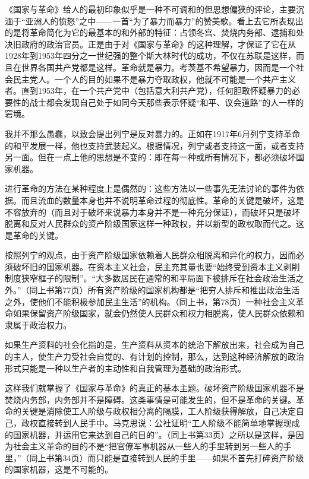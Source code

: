 \documentclass[UTF8, 12pt, a4paper]{ctexrep}
\begin{document}
《国家与革命》给人的最初印象似乎是一种不可调和的但思想偏狭的评论，主要沉湎于“亚洲人的愤怒”之中——一首“为了暴力而暴力”的赞美歌。看上去它所表现出的是将革命简化为它的最基本的和外部的特征：占领冬宫、焚烧内务部、逮捕和处决旧政府的政治官员。正是由于对《国家与革命》的这种理解，才保证了它在从1928年到1953年四分之一世纪强的整个斯大林时代的成功，不仅在苏联是这样，而且在世界各国共产党都是这样。革命就是暴力。考茨基不希望暴力，因而是一个社会民主党人。一个人的目的如果不是暴力夺取政权，他就不可能是一个共产主义者。直到1953年，在一个共产党中（包括意大利共产党），任何胆敢怀疑暴力的必要性的战士都会发现自己处于如同今天那些表示怀疑“和平、议会道路”的人一样的窘境。

我并不那么愚蠢，以致会提出列宁是反对暴力的。正如在1917年6月列宁支持革命的和平发展一样，他也支持武装起义。根据情况，列宁或者支持这一面，或者支持另一面。但在一点上他的思想是不变的：即在每一种或所有情况下，都必须破坏国家机器。

进行革命的方法在某种程度上是偶然的：这些方法以一些事先无法讨论的事件为依据。而且流血的数量本身也并不说明革命过程的彻底性。革命的关键是破坏，这是不容放弃的（而且对于破坏来说暴力本身并不是一种充分保证），而破坏只是破坏脱离和反对人民群众的资产阶级国家这样一种政权，并以新型的政权取而代之。这是革命的关键。

按照列宁的观点，由于资产阶级国家依赖着人民群众相脱离和异化的权力，因而必须破坏旧的国家机器。在资本主义社会，民主充其量也要“始终受到资本主义剥削制度狭窄框子的限制”。“大多数居民在通常的和平局面下被排斥在社会政治生活之外。”（同上书第77页）所有资产阶级的国家机构都是“把穷人排斥和推出政治生活之外，使他们不能积极参加民主生活”的机构。（同上书，第78页）一种社会主义革命如果保留资产阶级国家，就会仍然使人民群众和权力相脱离，使人民群众依赖和隶属于政治权力。

如果生产资料的社会化指的是，生产资料从资本的统治下解放出来，社会成为自己的主人，使生产力受社会自觉的、有计划的控制，那么，达到这种经济解放的政治形式只能是一种以生产者的主动性和自我管理为基础的政治形式。

这样我们就掌握了《国家与革命》的真正的基本主题。破坏资产阶级国家机器不是焚烧内务部，内务部并不是障碍。这类事情是可能发生的，但不是革命的关键。革命的关键是消除使工人阶级与政权相分离的隔膜，工人阶级获得解放，自己决定自己，政权直接转到人民手中。马克思说：公社证明“工人阶级不能简单地掌握现成的国家机器，并运用它来达到自己的目的”。（同上书第33页）之所以是这样，是因为社会主义革命的目的不是“把官僚军事机器从一些人的手里转到另一些人的手里，”（同上书第34页）而只能是直接转到人民的手里——如果不首先打碎资产阶级的国家机器，这是不可能的。
\end{document}
